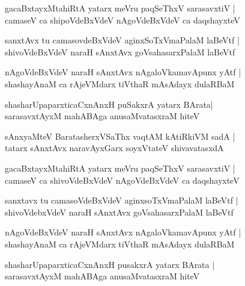 \documentclass[twoside,12pt,openright]{book}
\newcounter{shloka}[chapter]
\begin{document}
\begin{shloka}
gacaBxtayxMtahiRtA yatarx meVru paqSeThxV sarasavxtiV |\\
camaseV ca shipoVdeBxVdeV nAgoVdeBxVdeV ca daqshayxteV 
\end{shloka}

\begin{shloka}
sanxtAvx tu camasovdeBxVdeV aginxSoTxVmaPalaM laBeVtf |\\
shivoVdeBxVdeV naraH sAnxtAvx goVsahasarxPalaM laBeVtf
\end{shloka}

\begin{shloka}
nAgoVdeBxVdeV naraH sAnxtAvx nAgaloVkamavApunx yAtf |\\
shashayAnaM ca rAjeVMdarx tiVthaR mAsAdayx dulaRBaM 
\end{shloka}

\begin{shloka}
shasharUpaparxticaCxnAnxH puSakxrA yatarx BArata|\\
sarasavxtAyxM mahABAga anusaMvatasxraM hiteV
\end{shloka}

\begin{shloka}
sAnxyaMteV BaratasherxVSaThx vaqtAM kAtiRkiVM sadA |\\
tatarx sAnxtAvx naravAyxGarx soyxVtateV shivavatasxdA
\end{shloka}

\begin{shloka}
gacaBxtayxMtahiRtA yatarx meVru paqSeThxV sarasavxtiV |\\
camaseV ca shivoVdeBxVdeV nAgoVdeBxVdeV ca daqshayxteV 
\end{shloka}

\begin{shloka}
sanxtavx tu camasoVdeBxVdeV aginxsoTxVmaPalaM laBeVtf |\\
shivoVdebxVdeV naraH sAnxtAvx goVsahasarxPalaM laBeVtf 
\end{shloka}

\begin{shloka}
nAgoVdeBxVdeV naraH sAnxtAvx nAgaloVkamavApunx yAtf |\\
shashayAnaM ca rAjeVMdarx tiVthaR mAsAdayx dulaRBaM 
\end{shloka}

\begin{shloka}
shasharUpaparxticaCxnAnxH pusakxrA yatarx BArata |\\
sarasavxtAyxM mahABAga anusaMvatasxraM hiteV
\end{shloka}
\end{document}
